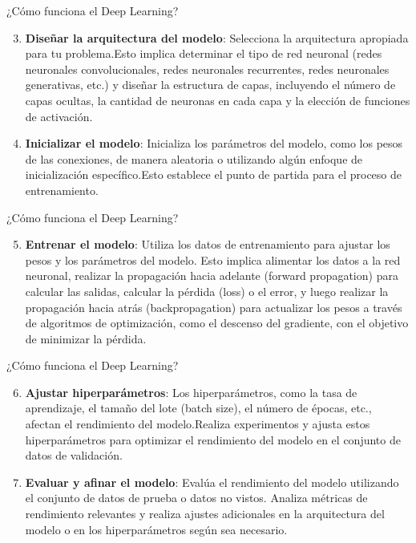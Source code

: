 \documentclass[11pt,aspectratio=169]{beamer}
\begin{document}
\begin{frame}{¿Cómo funciona el Deep Learning?}
	\begin{enumerate}
		\setcounter{enumi}{2}
		\item \textbf{Diseñar la arquitectura del modelo}: Selecciona la arquitectura apropiada para tu problema.\pause Esto implica determinar 
			el tipo de red neuronal (redes neuronales convolucionales, redes neuronales recurrentes, redes neuronales generativas, etc.) 
			y diseñar la estructura de capas, incluyendo el número de capas ocultas, la cantidad de neuronas en cada capa y la elección 
			de funciones de activación.\pause
		\item \textbf{Inicializar el modelo}: Inicializa los parámetros del modelo, como los pesos de las conexiones, de manera aleatoria 
			o utilizando algún enfoque de inicialización específico.\pause Esto establece el punto de partida para el proceso de entrenamiento.
	\end{enumerate}
\end{frame}


\begin{frame}{¿Cómo funciona el Deep Learning?}
	\begin{enumerate}
		\setcounter{enumi}{4}
		\item \textbf{Entrenar el modelo}: Utiliza los datos de entrenamiento para ajustar los pesos y los parámetros del modelo.\pause 
			Esto implica alimentar los datos a la red neuronal, realizar la propagación hacia adelante (forward propagation) para calcular las salidas, 
			calcular la pérdida (loss) o el error, y luego realizar la propagación hacia atrás (backpropagation) 
			para actualizar los pesos a través de algoritmos de optimización, como el descenso del gradiente, con el objetivo de minimizar la pérdida.
	\end{enumerate}
\end{frame}

\begin{frame}{¿Cómo funciona el Deep Learning?}
	\begin{enumerate}
		\setcounter{enumi}{5}
		\item \textbf{Ajustar hiperparámetros}: Los hiperparámetros, como la tasa de aprendizaje, el tamaño del lote (batch size), el número de 
			épocas, etc., afectan el rendimiento del modelo.\pause Realiza experimentos y ajusta estos hiperparámetros para optimizar el rendimiento 
			del modelo en el conjunto de datos de validación.\pause
		\item \textbf{Evaluar y afinar el modelo}: Evalúa el rendimiento del modelo utilizando el conjunto de datos de prueba o datos no vistos.\pause 
			Analiza métricas de rendimiento relevantes y realiza ajustes adicionales en la arquitectura del modelo o en los hiperparámetros según 
			sea necesario.
	\end{enumerate}
\end{frame}
\end{document}
